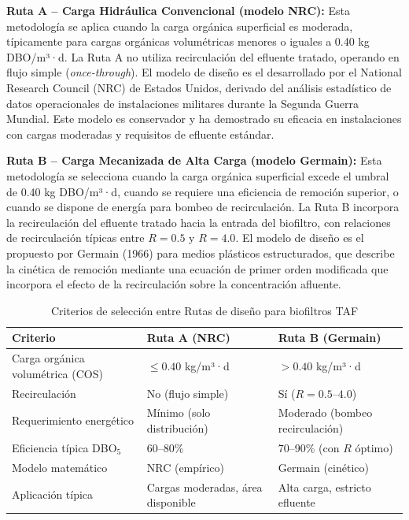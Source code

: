 \documentclass[12pt,a4paper]{article}
\begin{document}
\textbf{Ruta A -- Carga Hidráulica Convencional (modelo NRC):} Esta metodología se aplica cuando la carga orgánica superficial es moderada, típicamente para cargas orgánicas volumétricas menores o iguales a 0.40 kg DBO/m³·d. La Ruta A no utiliza recirculación del efluente tratado, operando en flujo simple (\textit{once-through}). El modelo de diseño es el desarrollado por el National Research Council (NRC) de Estados Unidos, derivado del análisis estadístico de datos operacionales de instalaciones militares durante la Segunda Guerra Mundial. Este modelo es conservador y ha demostrado su eficacia en instalaciones con cargas moderadas y requisitos de efluente estándar.

\textbf{Ruta B -- Carga Mecanizada de Alta Carga (modelo Germain):} Esta metodología se selecciona cuando la carga orgánica superficial excede el umbral de 0.40 kg DBO/m³·d, cuando se requiere una eficiencia de remoción superior, o cuando se dispone de energía para bombeo de recirculación. La Ruta B incorpora la recirculación del efluente tratado hacia la entrada del biofiltro, con relaciones de recirculación típicas entre $R = 0.5$ y $R = 4.0$. El modelo de diseño es el propuesto por Germain (1966) para medios plásticos estructurados, que describe la cinética de remoción mediante una ecuación de primer orden modificada que incorpora el efecto de la recirculación sobre la concentración afluente.

\begin{table}[H]
\centering
\caption{Criterios de selección entre Rutas de diseño para biofiltros TAF}
\label{tab:seleccion_ruta_taf}
\begin{tabular}{p{4.5cm}p{5cm}p{5cm}}
\toprule
\textbf{Criterio} & \textbf{Ruta A (NRC)} & \textbf{Ruta B (Germain)} \\
\midrule
Carga orgánica volumétrica (COS) & $\leq 0.40$ kg/m³·d & $> 0.40$ kg/m³·d \\
Recirculación & No (flujo simple) & Sí ($R = 0.5$--$4.0$) \\
Requerimiento energético & Mínimo (solo distribución) & Moderado (bombeo recirculación) \\
Eficiencia típica DBO$_5$ & 60--80\% & 70--90\% (con $R$ óptimo) \\
Modelo matemático & NRC (empírico) & Germain (cinético) \\
Aplicación típica & Cargas moderadas, área disponible & Alta carga, estricto efluente \\
\bottomrule
\end{tabular}
\end{table}
\end{document}
